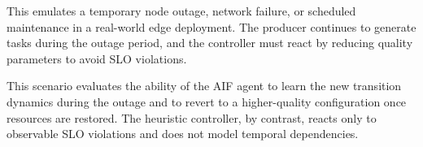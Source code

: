 This emulates a temporary node outage, network failure, or scheduled maintenance in a real-world edge deployment. The producer continues to generate tasks during the outage period, and the controller must react by reducing quality parameters to avoid SLO violations.

This scenario evaluates the ability of the AIF agent to learn the new transition dynamics during the outage and to revert to a higher-quality configuration once resources are restored. The heuristic controller, by contrast, reacts only to observable SLO violations and does not model temporal dependencies.

